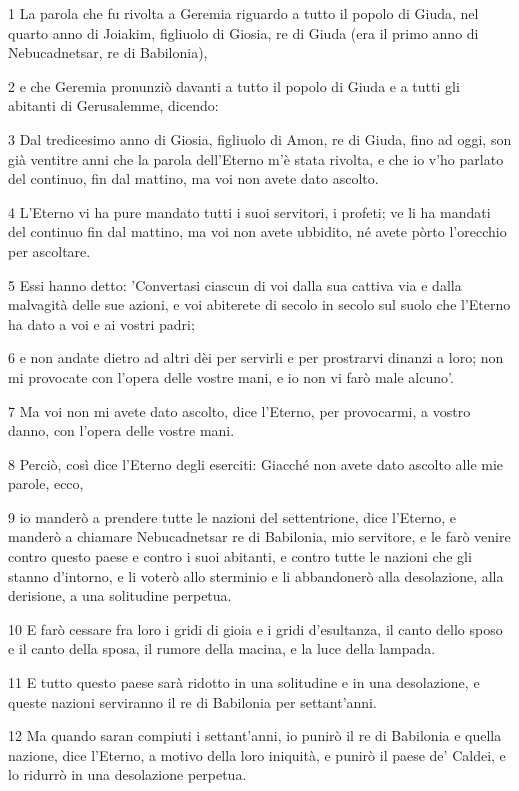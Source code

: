 \par 1 La parola che fu rivolta a Geremia riguardo a tutto il popolo di Giuda, nel quarto anno di Joiakim, figliuolo di Giosia, re di Giuda (era il primo anno di Nebucadnetsar, re di Babilonia),
\par 2 e che Geremia pronunziò davanti a tutto il popolo di Giuda e a tutti gli abitanti di Gerusalemme, dicendo:
\par 3 Dal tredicesimo anno di Giosia, figliuolo di Amon, re di Giuda, fino ad oggi, son già ventitre anni che la parola dell'Eterno m'è stata rivolta, e che io v'ho parlato del continuo, fin dal mattino, ma voi non avete dato ascolto.
\par 4 L'Eterno vi ha pure mandato tutti i suoi servitori, i profeti; ve li ha mandati del continuo fin dal mattino, ma voi non avete ubbidito, né avete pòrto l'orecchio per ascoltare.
\par 5 Essi hanno detto: 'Convertasi ciascun di voi dalla sua cattiva via e dalla malvagità delle sue azioni, e voi abiterete di secolo in secolo sul suolo che l'Eterno ha dato a voi e ai vostri padri;
\par 6 e non andate dietro ad altri dèi per servirli e per prostrarvi dinanzi a loro; non mi provocate con l'opera delle vostre mani, e io non vi farò male alcuno'.
\par 7 Ma voi non mi avete dato ascolto, dice l'Eterno, per provocarmi, a vostro danno, con l'opera delle vostre mani.
\par 8 Perciò, così dice l'Eterno degli eserciti: Giacché non avete dato ascolto alle mie parole, ecco,
\par 9 io manderò a prendere tutte le nazioni del settentrione, dice l'Eterno, e manderò a chiamare Nebucadnetsar re di Babilonia, mio servitore, e le farò venire contro questo paese e contro i suoi abitanti, e contro tutte le nazioni che gli stanno d'intorno, e li voterò allo sterminio e li abbandonerò alla desolazione, alla derisione, a una solitudine perpetua.
\par 10 E farò cessare fra loro i gridi di gioia e i gridi d'esultanza, il canto dello sposo e il canto della sposa, il rumore della macina, e la luce della lampada.
\par 11 E tutto questo paese sarà ridotto in una solitudine e in una desolazione, e queste nazioni serviranno il re di Babilonia per settant'anni.
\par 12 Ma quando saran compiuti i settant'anni, io punirò il re di Babilonia e quella nazione, dice l'Eterno, a motivo della loro iniquità, e punirò il paese de' Caldei, e lo ridurrò in una desolazione perpetua.
